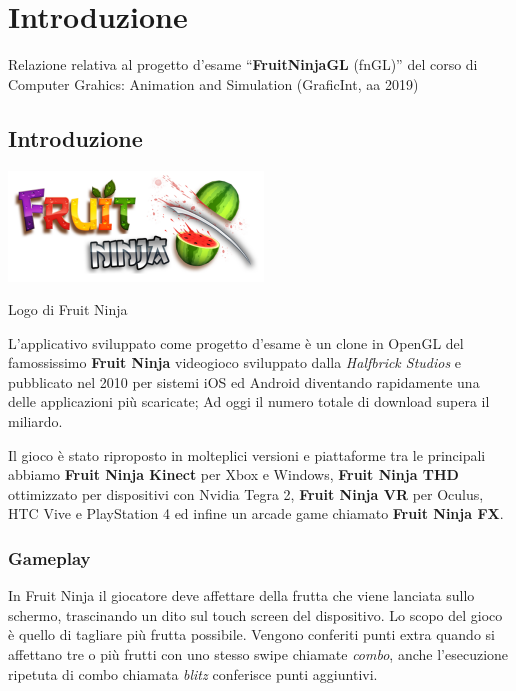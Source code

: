 \setchapterpreamble[u]{\margintoc}
\chapter{Introduzione}

\begin{chap-intro}
Relazione relativa al progetto d'esame \enquote{\textbf{FruitNinjaGL} (fnGL)} del corso di Computer Grahics: Animation and Simulation (GraficInt, aa 2019)
\end{chap-intro}

\section{Introduzione}
\begin{marginfigure}
\includegraphics[width=\linewidth]{images/ch10/0}
\caption{Logo di Fruit Ninja}
\end{marginfigure}
L'applicativo sviluppato come progetto d'esame è un clone in OpenGL del famossissimo \textbf{Fruit Ninja} videogioco sviluppato dalla \textit{Halfbrick Studios} e pubblicato nel 2010 per sistemi iOS ed Android diventando rapidamente una delle applicazioni più scaricate; Ad oggi il numero totale di download supera il miliardo.

Il gioco è stato riproposto in molteplici versioni e piattaforme tra le principali abbiamo \textbf{Fruit Ninja Kinect} per Xbox e Windows, \textbf{Fruit Ninja THD} ottimizzato per dispositivi con Nvidia Tegra 2, \textbf{Fruit Ninja VR} per Oculus, HTC Vive e PlayStation 4 ed infine un arcade game chiamato \textbf{Fruit Ninja FX}.


\subsection{Gameplay}
In Fruit Ninja il giocatore deve affettare della frutta che viene lanciata sullo schermo, trascinando un dito sul touch screen del dispositivo. Lo scopo del gioco è quello di tagliare più frutta possibile. Vengono conferiti punti extra quando si affettano tre o più frutti con uno stesso swipe chiamate \textit{combo}, anche l'esecuzione ripetuta di combo chiamata \textit{blitz} conferisce punti aggiuntivi.

